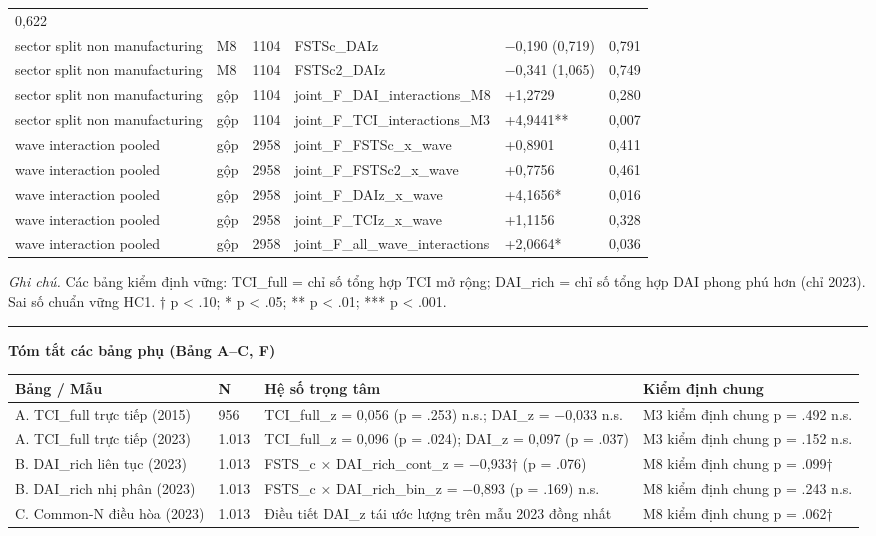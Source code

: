 \documentclass[12pt,a4paper]{article}
\begin{document}
\begin{longtable}[]{@{}llllll@{}}
0,622 \\
sector split non manufacturing & M8 & 1104 & FSTSc\_DAIz & −0,190
(0,719) & 0,791 \\
sector split non manufacturing & M8 & 1104 & FSTSc2\_DAIz & −0,341
(1,065) & 0,749 \\
sector split non manufacturing & gộp & 1104 &
joint\_F\_DAI\_interactions\_M8 & +1,2729 & 0,280 \\
sector split non manufacturing & gộp & 1104 &
joint\_F\_TCI\_interactions\_M3 & +4,9441** & 0,007 \\
wave interaction pooled & gộp & 2958 & joint\_F\_FSTSc\_x\_wave &
+0,8901 & 0,411 \\
wave interaction pooled & gộp & 2958 & joint\_F\_FSTSc2\_x\_wave &
+0,7756 & 0,461 \\
wave interaction pooled & gộp & 2958 & joint\_F\_DAIz\_x\_wave &
+4,1656* & 0,016 \\
wave interaction pooled & gộp & 2958 & joint\_F\_TCIz\_x\_wave & +1,1156
& 0,328 \\
wave interaction pooled & gộp & 2958 & joint\_F\_all\_wave\_interactions
& +2,0664* & 0,036 \\
\end{longtable}

\emph{Ghi chú.} Các bảng kiểm định vững: TCI\_full = chỉ số tổng hợp TCI
mở rộng; DAI\_rich = chỉ số tổng hợp DAI phong phú hơn (chỉ 2023). Sai
số chuẩn vững HC1. † p \textless{} .10; * p \textless{} .05; ** p
\textless{} .01; *** p \textless{} .001.

\begin{center}\rule{0.5\linewidth}{0.5pt}\end{center}

\textbf{Tóm tắt các bảng phụ (Bảng A--C, F)}

\begin{longtable}[]{@{}llll@{}}
\toprule\noalign{}
Bảng / Mẫu & N & Hệ số trọng tâm & Kiểm định chung \\
\midrule\noalign{}
\endhead
\bottomrule\noalign{}
\endlastfoot
A. TCI\_full trực tiếp (2015) & 956 & TCI\_full\_z = 0,056 (p = .253)
n.s.; DAI\_z = −0,033 n.s. & M3 kiểm định chung p = .492 n.s. \\
A. TCI\_full trực tiếp (2023) & 1.013 & TCI\_full\_z = 0,096 (p = .024);
DAI\_z = 0,097 (p = .037) & M3 kiểm định chung p = .152 n.s. \\
B. DAI\_rich liên tục (2023) & 1.013 & FSTS\_c × DAI\_rich\_cont\_z =
−0,933† (p = .076) & M8 kiểm định chung p = .099† \\
B. DAI\_rich nhị phân (2023) & 1.013 & FSTS\_c × DAI\_rich\_bin\_z =
−0,893 (p = .169) n.s. & M8 kiểm định chung p = .243 n.s. \\
C. Common-N điều hòa (2023) & 1.013 & Điều tiết DAI\_z tái ước lượng
trên mẫu 2023 đồng nhất & M8 kiểm định chung p = .062† \\
\end{longtable}
\end{document}
